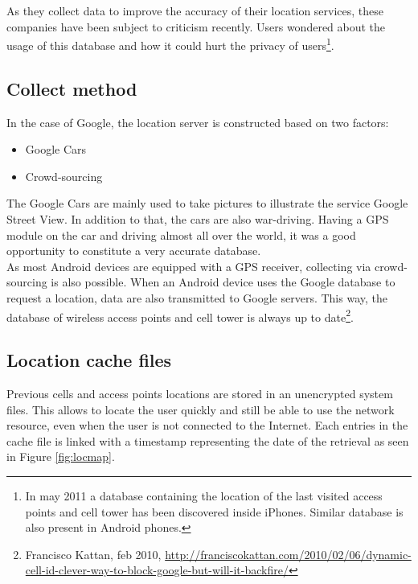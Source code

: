 As they collect data to improve the accuracy of their location services, these companies have been subject to criticism recently.
Users wondered about the usage of this database and how it could hurt the privacy of users\footnote{In may 2011 a database containing the location of the last visited access points and cell tower has been discovered inside iPhones. Similar database is also present in Android phones.}.

\subsection{Collect method}
In the case of Google, the location server is constructed based on two factors:
\begin{itemize}
\item Google Cars
\item Crowd-sourcing
\end{itemize}

The Google Cars are mainly used to take pictures to illustrate the service Google Street View.
In addition to that, the cars are also war-driving.
Having a GPS module on the car and driving almost all over the world, it was a good opportunity to constitute a very accurate database.\\

As most Android devices are equipped with a GPS receiver, collecting via crowd-sourcing is also possible.
When an Android device uses the Google database to request a location, data are also transmitted to Google servers.
This way, the database of wireless access points and cell tower is always up to date\footnote{Francisco Kattan, feb 2010, \url{http://franciscokattan.com/2010/02/06/dynamic-cell-id-clever-way-to-block-google-but-will-it-backfire/}}.

\subsection{Location cache files}

Previous cells and access points locations are stored in an unencrypted system files.
This allows to locate the user quickly and still be able to use the network resource, even when the user is not connected to the Internet.
Each entries in the cache file is linked with a timestamp representing the date of the retrieval as seen in Figure \ref{fig:locmap}.\\


